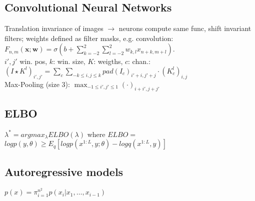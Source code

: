 \subsection*{Convolutional Neural Networks}
Translation invariance of images $\rightarrow$ neurons compute same func, shift invariant filters; weights defined as filter masks, e.g. convolution: $F_{n,m}(\mathbf{x};\mathbf{w}) = \sigma(b + \sum_{k=-2}^2\sum_{l=-2}^{2}{w_{k,l}x_{n+k,m+l}})$.\\
$i',j'$ win. pos, $k$: win. size, $K$: weigths, $c$: chan.:\\
 $(I\star K^l)_{i', j'} = \sum_c \sum_{-k\leq i,j \leq k} pad(I_c)_{i'+i,j'+j} \cdot(K_c^l)_{i,j}$\\
Max-Pooling (size 3): $\max_{-1\leq i', j' \leq 1}(\cdot)_{i+i', j+j'}$ %

\subsection*{ELBO}
$\lambda^* = argmax_\lambda ELBO(\lambda)$ where $ELBO=$\\
$log p(y,\theta) \geq E_q[log p(x^{1:L},y; \theta)-log q(x^{1:L}, y)]$

\subsection*{Autoregressive models}
$p(x)=\pi_{i=1}^{n^2} p(x_i|x_1,\dots ,x_{i-1})$